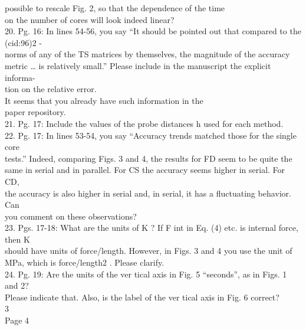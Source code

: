 possible to rescale Fig. 2, so that the dependence of the time \\on the
number of cores will look indeed linear? \\20. Pg. 16: In lines 54-56,
you say ``It should be pointed out that compared to the (cid:96)2 -
\\norms of any of the TS matrices by themselves, the magnitude of the
accuracy \\metric \ldots{} is relatively small.'' Please include in the
manuscript the explicit informa- \\tion on the relative error. \\It
seems that you already have such information in the \\paper repository.
\\21. Pg. 17: Include the values of the probe distances h used for each
method. \\22. Pg. 17: In lines 53-54, you say ``Accuracy trends matched
those for the single core \\tests.'' Indeed, comparing Figs. 3 and 4,
the results for FD seem to be quite the \\same in serial and in
parallel. For CS the accuracy seems higher in serial. For CD, \\the
accuracy is also higher in serial and, in serial, it has a ﬂuctuating
behavior. Can \\you comment on these observations? \\23. Pgs. 17-18:
What are the units of K ? If F int in Eq. (4) etc. is internal force,
then K \\should have units of force/length. However, in Figs. 3 and 4
you use the unit of \\MPa, which is force/length2 . Please clarify.
\\24. Pg. 19: Are the units of the ver tical axis in Fig. 5 ``seconds'',
as in Figs. 1 and 2? \\Please indicate that. Also, is the label of the
ver tical axis in Fig. 6 correct? \\

3 \\

Page 4

